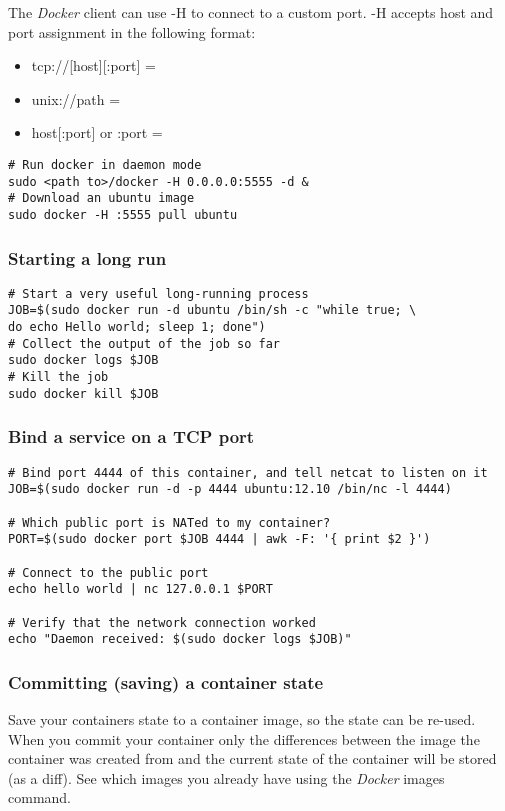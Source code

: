 \documentclass[11pt]{article}
\begin{document}
The \emph{Docker} client can use -H to connect to a custom port.
-H accepts host and port assignment in the following format: 
\begin{itemize}
\item tcp://[host][:port]  =
\item unix://path =
\item host[:port] or :port =
\end{itemize}


\begin{verbatim}
# Run docker in daemon mode
sudo <path to>/docker -H 0.0.0.0:5555 -d &
# Download an ubuntu image
sudo docker -H :5555 pull ubuntu
\end{verbatim}
\subsubsection{Starting a long run}
\label{sec-2-3-5}


\begin{verbatim}
# Start a very useful long-running process
JOB=$(sudo docker run -d ubuntu /bin/sh -c "while true; \
do echo Hello world; sleep 1; done")
# Collect the output of the job so far
sudo docker logs $JOB
# Kill the job
sudo docker kill $JOB
\end{verbatim}
\subsubsection{Bind a service on a TCP port}
\label{sec-2-3-6}


\begin{verbatim}
# Bind port 4444 of this container, and tell netcat to listen on it
JOB=$(sudo docker run -d -p 4444 ubuntu:12.10 /bin/nc -l 4444)

# Which public port is NATed to my container?
PORT=$(sudo docker port $JOB 4444 | awk -F: '{ print $2 }')

# Connect to the public port
echo hello world | nc 127.0.0.1 $PORT

# Verify that the network connection worked
echo "Daemon received: $(sudo docker logs $JOB)"
\end{verbatim}
\subsubsection{Committing (saving) a container state}
\label{sec-2-3-7}

Save your containers state to a container image, so the state can be re-used.
When you commit your container only the differences between the image the container was created from and the current state of the container will be stored (as a diff). See which images you already have using the \emph{Docker} images command.
\end{document}
